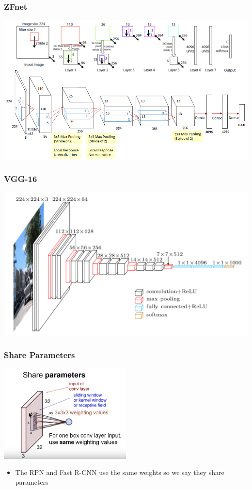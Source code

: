 \documentclass{beamer}
\begin{document}
    \begin{frame}
       \frametitle{ZFnet}
       \centering
         \includegraphics[width=1.0\textwidth]{images/zfnet.png}
    \end{frame}
    
    \begin{frame}
       \frametitle{VGG-16}
       \centering
         \includegraphics[width=1.0\textwidth]{images/vgg.png}
    \end{frame}
    
    
    \begin{frame}
       \frametitle{Share Parameters}
       \centering
         \includegraphics[width=0.5\textwidth]{images/shareparameters.PNG}
         \begin{itemize}
             \item The RPN and Fast R-CNN use the same weights so we say they share parameters
         \end{itemize}
    \end{frame}
    
\end{document}
